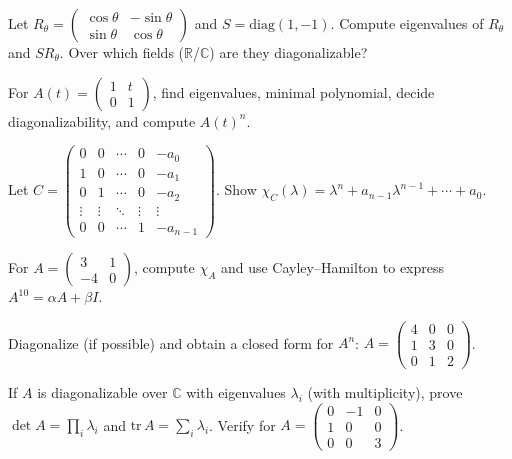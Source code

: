 \documentclass[11pt]{article}
\begin{document}
\begin{problem}
Let $R_\theta=\begin{pmatrix}\cos\theta&-\sin\theta\\ \sin\theta&\cos\theta\end{pmatrix}$ and $S=\mathrm{diag}(1,-1)$. 
Compute eigenvalues of $R_\theta$ and $SR_\theta$. Over which fields ($\mathbb{R}$/$\mathbb{C}$) are they diagonalizable?
\end{problem}

\begin{problem}
For $A(t)=\begin{pmatrix}1&t\\0&1\end{pmatrix}$, find eigenvalues, minimal polynomial, decide diagonalizability, and compute $A(t)^n$.
\end{problem}

\begin{problem}
Let
$C=\begin{pmatrix}
0&0&\cdots&0&-a_0\\
1&0&\cdots&0&-a_1\\
0&1&\cdots&0&-a_2\\
\vdots&\vdots&\ddots&\vdots&\vdots\\
0&0&\cdots&1&-a_{n-1}
\end{pmatrix}$.
Show $\chi_C(\lambda)=\lambda^n+a_{n-1}\lambda^{n-1}+\cdots+a_0$.
\end{problem}

\begin{problem}
For $A=\begin{pmatrix}3&1\\ -4&0\end{pmatrix}$, compute $\chi_A$ and use Cayley--Hamilton to express $A^{10}=\alpha A+\beta I$.
\end{problem}

\begin{problem}
Diagonalize (if possible) and obtain a closed form for $A^n$:
$A=\begin{pmatrix}4&0&0\\ 1&3&0\\ 0&1&2\end{pmatrix}$.
\end{problem}

\begin{problem}
If $A$ is diagonalizable over $\mathbb{C}$ with eigenvalues $\lambda_i$ (with multiplicity), prove $\det A=\prod_i\lambda_i$ and $\mathrm{tr}\,A=\sum_i\lambda_i$. Verify for $A=\begin{pmatrix}0&-1&0\\1&0&0\\0&0&3\end{pmatrix}$.
\end{problem}
\end{document}

